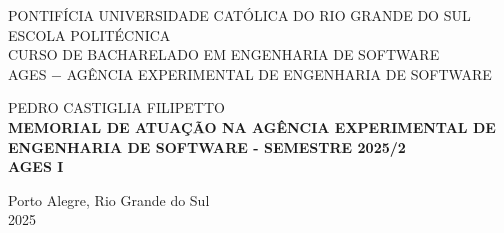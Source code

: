\author{Gustavo}

\def\autor{\uppercase{Pedro Castiglia Filipetto}}
\def\inicio{2025}
\def\fim{2025}
\def\ages{I}
\def\local{Porto Alegre, Rio Grande do Sul}
\def\ano{2025}

\begin{capa}
  \centering
    \uppercase{
      PONTIFÍCIA UNIVERSIDADE CATÓLICA DO RIO GRANDE DO SUL\\
      ESCOLA POLITÉCNICA\\
      CURSO DE BACHARELADO EM ENGENHARIA DE SOFTWARE\\
      AGES $-$ AGÊNCIA EXPERIMENTAL DE ENGENHARIA DE SOFTWARE\\
      }

    \vfill
    \autor\\
    \vfill
    \textbf{
      \uppercase{
        Memorial de atuação na Agência Experimental de Engenharia de Software 
        {-} Semestre 2025/2
        \\AGES \ages\
      }
    }
    
    \vfill

    \vfill
    \local\\
    \ano\
  \end{capa}